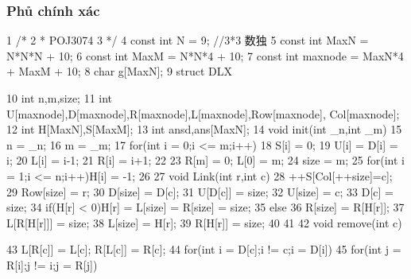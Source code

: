 \documentclass[11pt]{article}
\begin{document}
\subsubsection{Phủ chính xác}

\begin{Code}
 1   /*
 2    * POJ3074
 3    */
 4   const int N = 9; //3*3 数独
 5   const int MaxN = N*N*N + 10;
 6   const int MaxM = N*N*4 + 10;
 7   const int maxnode = MaxN*4 + MaxM + 10;
 8   char g[MaxN];
 9   struct DLX{
10       int n,m,size;
11       int U[maxnode],D[maxnode],R[maxnode],L[maxnode],Row[maxnode],
            Col[maxnode];
12       int H[MaxN],S[MaxM];
13       int ansd,ans[MaxN];
14       void init(int _n,int _m){
15           n = _n;
16           m = _m;
17           for(int i = 0;i <= m;i++){
18               S[i] = 0;
19               U[i] = D[i] = i;
20               L[i] = i-1;
21               R[i] = i+1;
22           }
23           R[m] = 0; L[0] = m;
24           size = m;
25           for(int i = 1;i <= n;i++)H[i] = -1;
26       }
27       void Link(int r,int c){
28           ++S[Col[++size]=c];
29           Row[size] = r;
30           D[size] = D[c];
31           U[D[c]] = size;
32           U[size] = c;
33           D[c] = size;
34           if(H[r] < 0)H[r] = L[size] = R[size] = size;
35           else{
36               R[size] = R[H[r]];
37               L[R[H[r]]] = size;
38               L[size] = H[r];
39               R[H[r]] = size;
40           }
41       }
42       void remove(int c){
43           L[R[c]] = L[c]; R[L[c]] = R[c];
44           for(int i = D[c];i != c;i = D[i])
45               for(int j = R[i];j != i;j = R[j]){


}}}
\end{Code}
\end{document}
